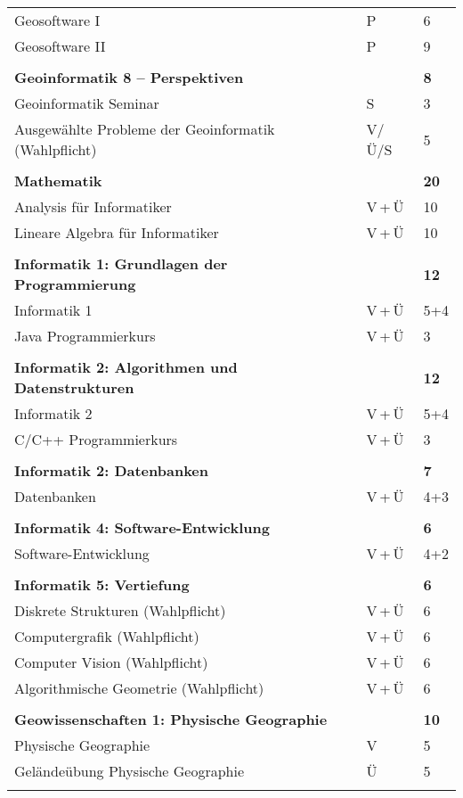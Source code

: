 \begin{longtable}{p{} p{} p{}}
Geosoftware I & P & 6\\
Geosoftware II & P & 9\\
&&\\
\textbf{Geoinformatik 8 -- Perspektiven}&& \textbf{8}\\
Geoinformatik Seminar & S & 3\\
Ausgewählte Probleme der Geoinformatik (Wahlpflicht) & V/Ü/S & 5\\
&&\\
\textbf{Mathematik}&& \textbf{20}\\
Analysis für Informatiker  & V\,+\,Ü & 10\\
Lineare Algebra für Informatiker & V\,+\,Ü & 10\\
&&\\
\textbf{Informatik 1: Grundlagen der Programmierung} & & \textbf{12}\\
Informatik 1 & V\,+\,Ü & 5+4\\
Java Programmierkurs & V\,+\,Ü & 3\\
&&\\
\textbf{Informatik 2: Algorithmen und Datenstrukturen} & & \textbf{12}\\
Informatik 2 & V\,+\,Ü & 5+4\\
C/C++ Programmierkurs & V\,+\,Ü & 3\\
&&\\
\textbf{Informatik 2: Datenbanken} & & \textbf{7}\\
Datenbanken & V\,+\,Ü & 4+3\\
&&\\
\textbf{Informatik 4: Software-Entwicklung}& &\textbf{6}\\
Software-Entwicklung & V\,+\,Ü & 4+2\\
&&\\
\textbf{Informatik 5: Vertiefung} & & \textbf{6}\\
Diskrete Strukturen (Wahlpflicht) & V\,+\,Ü & 6\\
Computergrafik (Wahlpflicht) & V\,+\,Ü & 6\\
Computer Vision (Wahlpflicht) & V\,+\,Ü & 6\\
Algorithmische Geometrie (Wahlpflicht) & V\,+\,Ü & 6\\
&&\\
\textbf{Geowissenschaften 1: Physische Geographie} & & \textbf{10}\\
Physische Geographie & V & 5\\
Geländeübung Physische Geographie & Ü & 5\\
&&\\

\end{longtable}

